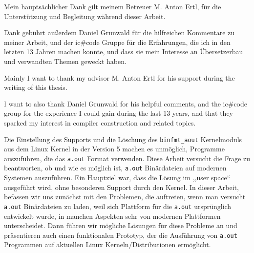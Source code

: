 \documentclass[draft,final]{vutinfth} %
\begin{document}
\frontmatter %

\addstatementpage

\begin{danksagung*}
Mein hauptsächlicher Dank gilt meinem Betreuer M. Anton Ertl, für die Unterstützung und Begleitung während dieser Arbeit.

Dank gebührt außerdem Daniel Grunwald für die hilfreichen Kommentare zu meiner Arbeit, und der ic\#code Gruppe für die Erfahrungen, die ich in den letzten 13 Jahren machen konnte, und dass sie mein Interesse an Übersetzerbau und verwandten Themen geweckt haben.
\end{danksagung*}

\begin{acknowledgements*}
Mainly I want to thank my advisor M. Anton Ertl for his support during the writing of this thesis.

I want to also thank Daniel Grunwald for his helpful comments, and the ic\#code group for the experience I could gain during the last 13 years, and that they sparked my interest in compiler construction and related topics.
\end{acknowledgements*}

\begin{kurzfassung}
Die Einstellung des Supports und die Löschung des \texttt{binfmt\_aout} Kernelmoduls aus dem Linux Kernel in der Version 5 machen es unmöglich, Programme auszuführen, die das \texttt{a.out} Format verwenden. Diese Arbeit versucht die Frage zu beantworten, ob und wie es möglich ist, \texttt{a.out} Binärdateien auf modernen Systemen auszuführen. Ein Hauptziel war, dass die Lösung im ,,user space`` ausgeführt wird, ohne besonderen Support durch den Kernel. In dieser Arbeit, befassen wir uns zunächst mit den Problemen, die auftreten, wenn man versucht \texttt{a.out} Binärdateien zu laden, weil sich Plattform für die \texttt{a.out} ursprünglich entwickelt wurde, in manchen Aspekten sehr von modernen Plattformen unterscheidet. Dann führen wir mögliche Lösungen für diese Probleme an und präsentieren auch einen funktionalen Prototyp, der die Ausführung von \texttt{a.out} Programmen auf aktuellen Linux Kerneln/Distributionen ermöglicht.
\end{kurzfassung}
\end{document}
